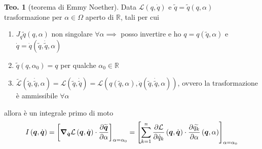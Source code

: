 \documentclass[a4paper,10pt]{article}
\theoremstyle{definition}
\newcommand{\bv}{\boldsymbol} %
\theoremstyle{indentdefinition}
\theoremstyle{indenttheorem}
\newtheorem{thm}{Teo.}
\theoremstyle{myremark}
\theoremstyle{indentgeneral}
\newenvironment{myboxed} 
{\noindent\begin{lrbox}{\mybox}\begin{minipage}{\textwidth}}
{\end{minipage}\end{lrbox}\fbox{\usebox{\mybox}}}
\begin{document}
\begin{myboxed}
\begin{thm}[teorema di Emmy Noether]
\label{thm:teorema-Emmy-Noether}Data $\mathcal{L}\left(q,\dot{q}\right)$
 e $\widetilde{q}=\widetilde{q}\left(q,\alpha\right)$
trasformazione per $\alpha\in\Omega$ aperto di $\mathbb{R}$, tali
per cui
\begin{enumerate}
\item $J_{q}\widetilde{q}\left(q,\alpha\right)$ non singolare $\forall\alpha \implies$ posso invertire e ho $q=q(\widetilde{q},\alpha)$ e $\dot{q}=\dot{q}(\widetilde{q},\dot{\widetilde{q}},\alpha)$
\item $\widetilde{q}\left(q,\alpha_{0}\right)=q$ per qualche $\alpha_{0}\in\mathbb{R}$
\item $\widetilde{\mathcal{L}}\left(\widetilde{q},\dot{\widetilde{q}},\alpha\right)=\mathcal{L}\left(\widetilde{q},\dot{\widetilde{q}}\right)=\mathcal{L}\left(q(\widetilde{q},\alpha),\dot{q}(\widetilde{q},\dot{\widetilde{q}},\alpha)\right)$,
ovvero la trasformazione è ammissibile $\forall\alpha$
\end{enumerate}
allora è un integrale primo di moto
\[
I\left(\bv{q},\dot{\bv{q}}\right)=\left[\grad_{\dot{\bv{q}}}\mathcal{L}\left(\bv{q},\dot{\bv{q}}\right)\cdot\frac{\partial\widetilde{\bv{q}}}{\partial\alpha}\right]_{\alpha=\alpha_{0}}=\left[\sum_{k=1}^{n}\frac{\partial\mathcal{L}}{\partial\dot{q}_{k}}\left(\bv{q},\dot{\bv{q}}\right)\cdot\frac{\partial\widetilde{q_{k}}}{\partial\alpha}\left(\bv{q},\alpha\right)\right]_{\alpha=\alpha_{0}}
\]
\end{thm}
\end{myboxed}
\end{document}
